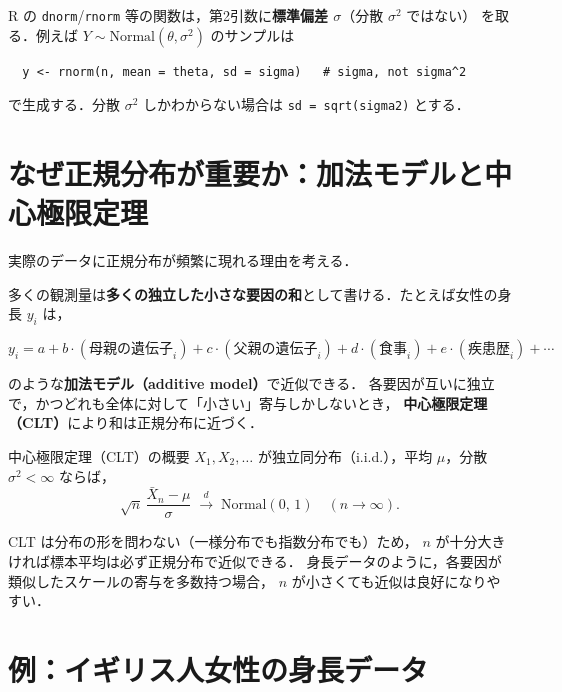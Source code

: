 \documentclass[lualatex,ja=standard,a4paper,12pt]{bxjsarticle}
\begin{document}
\begin{pointbox}
R の \texttt{dnorm}/\texttt{rnorm} 等の関数は，第2引数に\textbf{標準偏差 $\sigma$}（分散 $\sigma^2$ ではない）
を取る．例えば $Y \sim \mathrm{Normal}(\theta, \sigma^2)$ のサンプルは
\begin{verbatim}
  y <- rnorm(n, mean = theta, sd = sigma)   # sigma, not sigma^2
\end{verbatim}
で生成する．分散 $\sigma^2$ しかわからない場合は \texttt{sd = sqrt(sigma2)} とする．
\end{pointbox}


\section{なぜ正規分布が重要か：加法モデルと中心極限定理}

実際のデータに正規分布が頻繁に現れる理由を考える．

多くの観測量は\textbf{多くの独立した小さな要因の和}として書ける．たとえば女性の身長 $y_i$ は，

\[
  y_i
  = a + b\cdot(\text{母親の遺伝子}_i)
    + c\cdot(\text{父親の遺伝子}_i)
    + d\cdot(\text{食事}_i)
    + e\cdot(\text{疾患歴}_i)
    + \cdots
\]

のような\textbf{加法モデル（additive model）}で近似できる．
各要因が互いに独立で，かつどれも全体に対して「小さい」寄与しかしないとき，
\textbf{中心極限定理（CLT）}により和は正規分布に近づく．

\begin{thmbox}{中心極限定理（CLT）の概要}
$X_1, X_2, \ldots$ が独立同分布（i.i.d.），平均 $\mu$，分散 $\sigma^2 < \infty$ ならば，
\[
  \sqrt{n}\,\frac{\bar{X}_n - \mu}{\sigma}
  \;\xrightarrow{d}\; \mathrm{Normal}(0,\, 1)
  \quad (n \to \infty).
\]
\end{thmbox}

CLT は分布の形を問わない（一様分布でも指数分布でも）ため，
$n$ が十分大きければ標本平均は必ず正規分布で近似できる．
身長データのように，各要因が類似したスケールの寄与を多数持つ場合，
$n$ が小さくても近似は良好になりやすい．


\section{例：イギリス人女性の身長データ}
\end{document}
